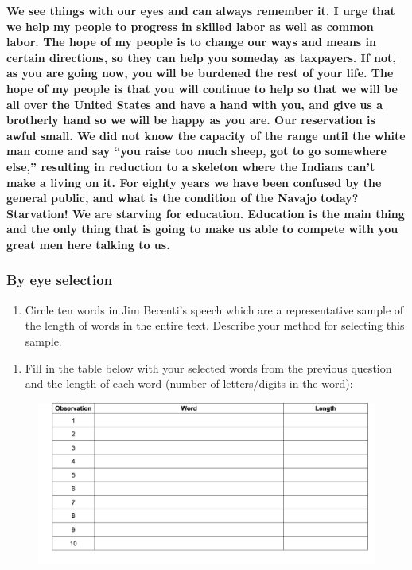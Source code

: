 \documentclass[
]{report}
\providecommand{\tightlist}{%
  \setlength{\itemsep}{0pt}\setlength{\parskip}{0pt}}
\begin{document}
\textbf{We see things with our eyes and can always remember it. I urge that we help my people to progress in skilled labor as well as common labor. The hope of my people is to change our ways and means in certain directions, so they can help you someday as taxpayers. If not, as you are going now, you will be burdened the rest of your life. The hope of my people is that you will continue to help so that we will be all over the United States and have a hand with you, and give us a brotherly hand so we will be happy as you are. Our reservation is awful small. We did not know the capacity of the range until the white man come and say ``you raise too much sheep, got to go somewhere else,'' resulting in reduction to a skeleton where the Indians can't make a living on it. For eighty years we have been confused by the general public, and what is the condition of the Navajo today? Starvation! We are starving for education. Education is the main thing and the only thing that is going to make us able to compete with you great men here talking to us.}

\hypertarget{by-eye-selection}{%
\subsubsection*{By eye selection}\label{by-eye-selection}}

\begin{enumerate}
\def\labelenumi{\arabic{enumi}.}
\setcounter{enumi}{4}
\tightlist
\item
  Circle ten words in Jim Becenti's speech which are a representative sample of the length of words in the entire text. Describe your method for selecting this sample.
\end{enumerate}

\vspace{0.5in}

\begin{enumerate}
\def\labelenumi{\arabic{enumi}.}
\setcounter{enumi}{5}
\tightlist
\item
  Fill in the table below with your selected words from the previous question and the length of each word (number of letters/digits in the word):
  \vspace{1mm}
\end{enumerate}

\begin{figure}

{\centering \includegraphics[width=0.5\linewidth]{images/word_length} 

}

\end{figure}
\end{document}
